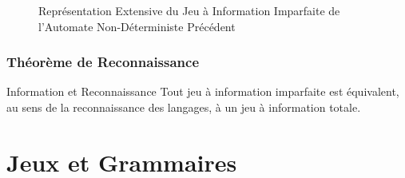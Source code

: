 \documentclass{beamercours}
\begin{document}
\begin{frame}
{\begin{figure}
{}
        \caption{Représentation Extensive du Jeu à Information Imparfaite de l'Automate Non-Déterministe Précédent}
        \label{fig:gametree:nfa1}
    \end{figure}}
\end{frame}
\begin{frame}
\frametitle{Théorème de Reconnaissance}
    \begin{théorème}{Information et Reconnaissance}{}
    Tout jeu à information imparfaite est équivalent, au sens de la reconnaissance des langages, à un jeu à information totale.
    \end{théorème}
\end{frame}

\section{Jeux et Grammaires}
\end{document}
